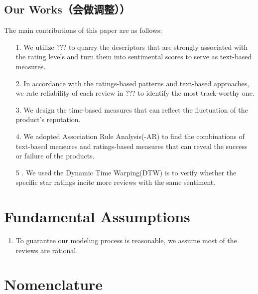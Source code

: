 \documentclass[12pt]{article}%
\begin{document}
\subsection{Our Works（会做调整））}
The main contributions of this paper are as follows:
\begin{itemize} 
	\item [1.] We utilize ??? to quarry the descriptors that are strongly associated with the rating levels and turn them into sentimental scores to serve as text-based measures. 
	\item [2.] In accordance with the ratings-based patterns and text-based approaches, we rate reliability of each review in ??? to identify the most track-worthy one.      
	\item [3.] We design the time-based measures that can reflect the fluctuation of the product’s reputation. 
	\item [4.] We adopted Association Rule Analysis(-AR) to find the combinations of text-based measures and ratings-based measures that can reveal the success or failure of the products.
	\item [5 .]We used the Dynamic Time Warping(DTW) is  to verify whether the specific star ratings incite more reviews with the same sentiment.
\end{itemize}

\section{Fundamental Assumptions}
\begin{enumerate}
	\item  To guarantee our modeling process is reasonable, we assume most of the reviews are rational.  
\end{enumerate}

\section{Nomenclature}
\end{document}
